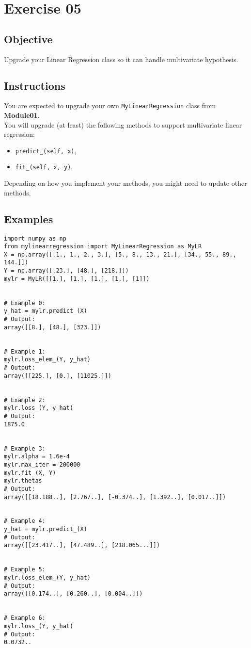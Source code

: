 \chapter{Exercise 05}
\makeheaderfilesforbidden

\section*{Objective}
Upgrade your Linear Regression class so it can handle multivariate hypothesis.

\section*{Instructions}
You are expected to upgrade your own \texttt{MyLinearRegression} class from \textbf{Module01}.\\
\newline
You will upgrade (at least) the following methods to support multivariate linear regression:
\begin{itemize}
  \item \texttt{predict\_(self, x)}, 
  \item \texttt{fit\_(self, x, y)}.
\end{itemize}
Depending on how you implement your methods, you might need to update other methods.

\section*{Examples}
\begin{verbatim}
import numpy as np
from mylinearregression import MyLinearRegression as MyLR
X = np.array([[1., 1., 2., 3.], [5., 8., 13., 21.], [34., 55., 89., 144.]])
Y = np.array([[23.], [48.], [218.]])
mylr = MyLR([[1.], [1.], [1.], [1.], [1]])


# Example 0:
y_hat = mylr.predict_(X)
# Output:
array([[8.], [48.], [323.]])


# Example 1:
mylr.loss_elem_(Y, y_hat)
# Output:
array([[225.], [0.], [11025.]])


# Example 2:
mylr.loss_(Y, y_hat)
# Output:
1875.0


# Example 3:
mylr.alpha = 1.6e-4
mylr.max_iter = 200000
mylr.fit_(X, Y)
mylr.thetas
# Output:
array([[18.188..], [2.767..], [-0.374..], [1.392..], [0.017..]])


# Example 4:
y_hat = mylr.predict_(X)
# Output:
array([[23.417..], [47.489..], [218.065...]])


# Example 5:
mylr.loss_elem_(Y, y_hat)
# Output:
array([[0.174..], [0.260..], [0.004..]])


# Example 6:
mylr.loss_(Y, y_hat)
# Output:
0.0732..
\end{verbatim}